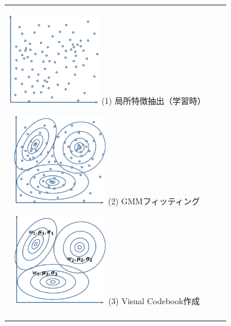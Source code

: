 \begin{figure}[htbp]
\begin{tabular}{ccc}
%
 \begin{minipage}{0.33\textwidth}
  \begin{center}
   \includegraphics[height=40mm]{figure/fisher_1.eps}
   \hspace{1.6cm} (1) 局所特徴抽出（学習時）
  \end{center}
 \end{minipage}
%
 \begin{minipage}{0.33\textwidth}
  \begin{center}
   \includegraphics[height=40mm]{figure/fisher_2.eps}
   \hspace{1.6cm} (2) GMMフィッティング
  \end{center}
 \end{minipage}
%
 \begin{minipage}{0.33\textwidth}
  \begin{center}
   \includegraphics[height=40mm]{figure/fisher_3.eps}
   \hspace{1.6cm} (3) Visual Codebook作成
  \end{center}
 \end{minipage} \\
%
 \begin{minipage}{0.33\textwidth}

\end{minipage}
\end{tabular}
\end{figure}
